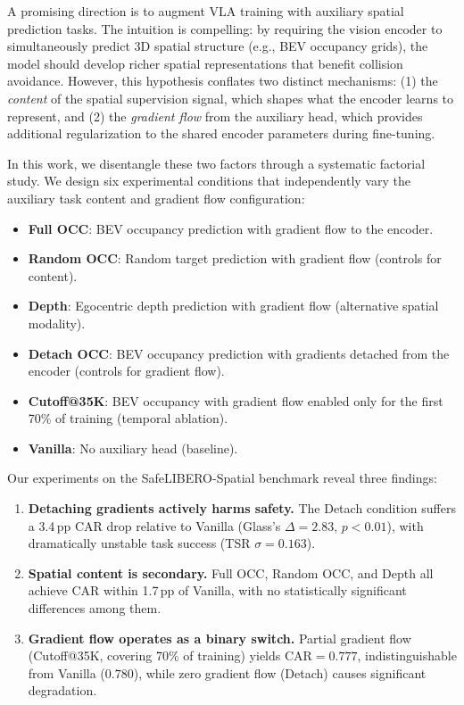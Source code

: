 \documentclass[letterpaper]{article}
\newcommand{\pp}{\,\textrm{pp}}
\begin{document}
A promising direction is to augment VLA training with auxiliary spatial prediction tasks.
The intuition is compelling: by requiring the vision encoder to simultaneously predict 3D spatial structure (e.g., BEV occupancy grids), the model should develop richer spatial representations that benefit collision avoidance.
However, this hypothesis conflates two distinct mechanisms: (1) the \emph{content} of the spatial supervision signal, which shapes what the encoder learns to represent, and (2) the \emph{gradient flow} from the auxiliary head, which provides additional regularization to the shared encoder parameters during fine-tuning.

In this work, we disentangle these two factors through a systematic factorial study. We design six experimental conditions that independently vary the auxiliary task content and gradient flow configuration:
\begin{itemize}
    \item \textbf{Full OCC}: BEV occupancy prediction with gradient flow to the encoder.
    \item \textbf{Random OCC}: Random target prediction with gradient flow (controls for content).
    \item \textbf{Depth}: Egocentric depth prediction with gradient flow (alternative spatial modality).
    \item \textbf{Detach OCC}: BEV occupancy prediction with gradients detached from the encoder (controls for gradient flow).
    \item \textbf{Cutoff@35K}: BEV occupancy with gradient flow enabled only for the first 70\% of training (temporal ablation).
    \item \textbf{Vanilla}: No auxiliary head (baseline).
\end{itemize}

Our experiments on the SafeLIBERO-Spatial benchmark reveal three findings:
\begin{enumerate}
    \item \textbf{Detaching gradients actively harms safety.} The Detach condition suffers a 3.4\pp{} CAR drop relative to Vanilla (Glass's $\Delta=2.83$, $p<0.01$), with dramatically unstable task success (TSR $\sigma=0.163$).
    \item \textbf{Spatial content is secondary.} Full OCC, Random OCC, and Depth all achieve CAR within 1.7\pp{} of Vanilla, with no statistically significant differences among them.
    \item \textbf{Gradient flow operates as a binary switch.} Partial gradient flow (Cutoff@35K, covering 70\% of training) yields CAR$=0.777$, indistinguishable from Vanilla ($0.780$), while zero gradient flow (Detach) causes significant degradation.
\end{enumerate}
\end{document}

